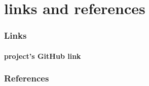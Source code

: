 \documentclass[12pt,a4paper]{article}
\begin{document}
	\newpage
	\setcounter{section}{0}
	\part{links and references}\label{linkAndRef}
	
	\section{Links}\label{linkAndRef.links}
	\subsection*{project's GitHub link}
	\href{https://github.com/Matin0789/FinalFight.git}{\uline{\color{blue}{https://github.com/Matin0789/FinalFight.git}}}
	
	
	\section{References}\label{linkAndRef.ref}
	
\end{document}
